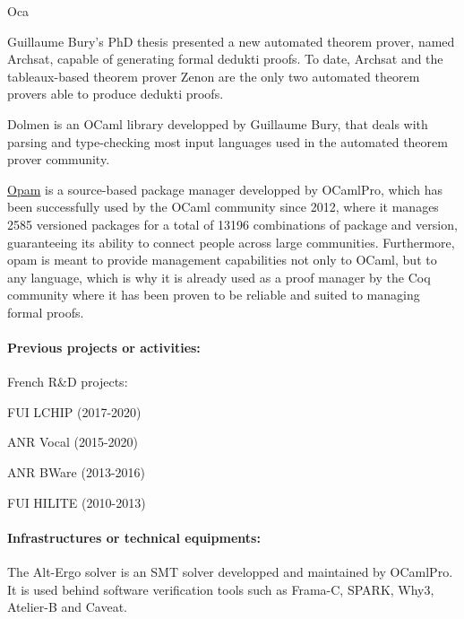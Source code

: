 \begin{sitedescription}{Oca}
\begin{compactitem}
\item Guillaume Bury's PhD thesis\cite{BURY19} presented a new automated theorem
  prover, named Archsat, capable of generating formal dedukti proofs. To date,
  Archsat and the tableaux-based theorem prover Zenon are the only two automated
  theorem provers able to produce dedukti proofs.
\item Dolmen is an OCaml library developped by Guillaume Bury,
  that deals with parsing and type-checking most input languages used in
  the automated theorem prover community.
\item \href{https://opam.ocaml.org/}{Opam} is a source-based package manager developped by OCamlPro,
  which has been successfully used by the OCaml community since 2012, where
  it manages 2585 versioned packages for a total of 13196 combinations of package
  and version, guaranteeing its ability to connect people across large communities.
  Furthermore, opam is meant to provide management capabilities not only to
  OCaml, but to any language, which is why it is already used as a proof manager
  by the Coq community where it has been proven to be reliable and suited to
  managing formal proofs.
\end{compactitem}

\paragraph*{Previous projects or activities:}

French R\&D projects:
\begin{compactitem}
\item FUI LCHIP (2017-2020)
\item ANR Vocal (2015-2020)
\item ANR BWare (2013-2016)
\item FUI HILITE (2010-2013)
\end{compactitem}

\paragraph*{Infrastructures or technical equipments:}

\begin{compactitem}
\item The Alt-Ergo solver\cite{ae2.2} is an SMT solver developped and
  maintained by OCamlPro. It is used behind software verification tools
  such as Frama-C, SPARK, Why3, Atelier-B and Caveat.
\end{compactitem}


\end{sitedescription}
